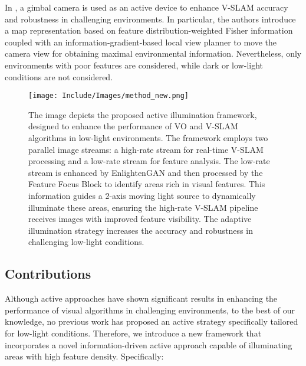 In \cite{wang2023active}, a gimbal camera is used as an active device to enhance V-SLAM accuracy and robustness in challenging environments. In particular, the authors introduce a map representation based on feature distribution-weighted Fisher information coupled with an information-gradient-based local view planner to move the camera view for obtaining maximal environmental information. Nevertheless, only environments with poor features are considered, while dark or low-light conditions are not considered.





 \begin{figure*}[t]
     \centering
     \texttt{[image: Include/Images/method\_new.png]}\\
     \caption{The image depicts the proposed active illumination framework, designed to enhance the performance of VO and V-SLAM algorithms in low-light environments. The framework employs two parallel image streams: a high-rate stream for real-time V-SLAM processing and a low-rate stream for feature analysis. The low-rate stream is enhanced by EnlightenGAN and then processed by the Feature Focus Block to identify areas rich in visual features. This information guides a 2-axis moving light source to dynamically illuminate these areas, ensuring the high-rate V-SLAM pipeline receives images with improved feature visibility. The adaptive illumination strategy increases the accuracy and robustness in challenging low-light conditions.}
     \label{fig:framework_overview}
     \vspace{-1em}
\end{figure*}


\subsection{Contributions}
Although active approaches have shown significant results in enhancing the performance of visual algorithms in challenging environments, to the best of our knowledge, no previous work has proposed an active strategy specifically tailored for low-light conditions. Therefore, we introduce a new framework that incorporates a novel information-driven active approach capable of illuminating areas with high feature density. Specifically:

